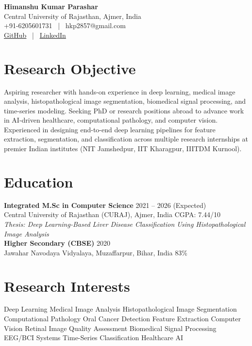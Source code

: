 \documentclass[a4paper,10pt]{article}
\begin{document}
\begin{center}
{\LARGE \textbf{Himanshu Kumar Parashar}}\\[2pt]
Central University of Rajasthan, Ajmer, India\\
+91-6205601731 \ | \ hkp2857@gmail.com\\
\href{https://github.com/parasharcuraj}{GitHub} \ | \
\href{https://www.linkedin.com/in/himanshu-parashar-a7217322a}{LinkedIn}
\end{center}


\section{Research Objective}
Aspiring researcher with hands-on experience in deep learning, medical image analysis, histopathological image segmentation, biomedical signal processing, and time-series modeling. Seeking PhD or research positions abroad to advance work in AI-driven healthcare, computational pathology, and computer vision. Experienced in designing end-to-end deep learning pipelines for feature extraction, segmentation, and classification across multiple research internships at premier Indian institutes (NIT Jamshedpur, IIT Kharagpur, IIITDM Kurnool).


\section{Education}

\textbf{Integrated M.Sc in Computer Science} \hfill 2021 -- 2026 (Expected)\\
Central University of Rajasthan (CURAJ), Ajmer, India \hfill CGPA: 7.44/10\\
\textit{Thesis: Deep Learning-Based Liver Disease Classification Using Histopathological Image Analysis}\\[2pt]
\textbf{Higher Secondary (CBSE)} \hfill 2020\\
Jawahar Navodaya Vidyalaya, Muzaffarpur, Bihar, India \hfill 83\%


\section{Research Interests}
Deep Learning \textbullet{} Medical Image Analysis \textbullet{} Histopathological Image Segmentation \textbullet{} Computational Pathology \textbullet{}
Oral Cancer Detection \textbullet{} Feature Extraction \textbullet{} Computer Vision \textbullet{} Retinal Image Quality Assessment \textbullet{}
Biomedical Signal Processing \textbullet{} EEG/BCI Systems \textbullet{} Time-Series Classification \textbullet{} Healthcare AI
\end{document}

